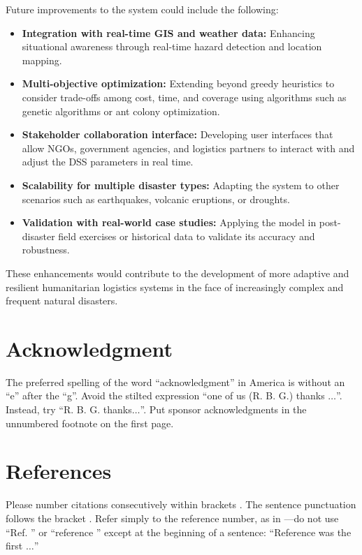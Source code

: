 \documentclass[journal,final,a4paper,twoside,11pt]{IEEEtran}
\begin{document}
Future improvements to the system could include the following:

\begin{itemize}
    \item \textbf{Integration with real-time GIS and weather data:} Enhancing situational awareness through real-time hazard detection and location mapping.
    \item \textbf{Multi-objective optimization:} Extending beyond greedy heuristics to consider trade-offs among cost, time, and coverage using algorithms such as genetic algorithms or ant colony optimization.
    \item \textbf{Stakeholder collaboration interface:} Developing user interfaces that allow NGOs, government agencies, and logistics partners to interact with and adjust the DSS parameters in real time.
    \item \textbf{Scalability for multiple disaster types:} Adapting the system to other scenarios such as earthquakes, volcanic eruptions, or droughts.
    \item \textbf{Validation with real-world case studies:} Applying the model in post-disaster field exercises or historical data to validate its accuracy and robustness.
\end{itemize}

These enhancements would contribute to the development of more adaptive and resilient humanitarian logistics systems in the face of increasingly complex and frequent natural disasters.


\section*{Acknowledgment}

The preferred spelling of the word ``acknowledgment'' in America is without 
an ``e'' after the ``g''. Avoid the stilted expression ``one of us (R. B. 
G.) thanks $\ldots$''. Instead, try ``R. B. G. thanks$\ldots$''. Put sponsor 
acknowledgments in the unnumbered footnote on the first page.

\section*{References}

Please number citations consecutively within brackets \cite{b1}. The 
sentence punctuation follows the bracket \cite{b2}. Refer simply to the reference 
number, as in \cite{b3}---do not use ``Ref. \cite{b3}'' or ``reference \cite{b3}'' except at 
the beginning of a sentence: ``Reference \cite{b3} was the first $\ldots$''
\end{document}

